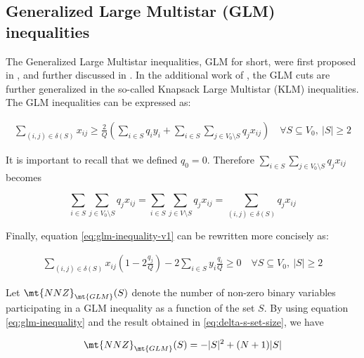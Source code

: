 \subsection{Generalized Large Multistar (GLM) inequalities}
The Generalized Large Multistar inequalities, GLM for short, were first proposed in \cite{gouveia_result_1995}, and further discussed in \cite{letchford2006projection}.
In the additional work of \cite{letchford_multistars_2002}, the GLM cuts are further generalized in the so-called Knapsack Large Multistar (KLM) inequalities.
The GLM inequalities can be expressed as:

\begin{equation}\label{eq:glm-inequality-v1}
	\begin{split}
		\sum_{(i, j) \in \delta(S)} x_{ij} \ge \frac{2}{Q} \left(  \sum_{i \in S} q_i y_i + \sum_{i \in S} \sum_{j \in V_0 \setminus S} q_j  x_{ij}\right) \quad \forall S \subseteq V_0,\ |S| \ge 2
	\end{split}
\end{equation}

It is important to recall that we defined $q_0 = 0$.
Therefore $\sum_{i \in S} \sum_{j \in V_0 \setminus S} q_j  x_{ij}$ becomes

\begin{equation}
	\sum_{i \in S} \sum_{j \in V_0 \setminus S} q_j  x_{ij} = \sum_{i \in S} \sum_{j \in V \setminus S} q_j  x_{ij} = \sum_{(i, j) \in \delta(S)} q_j x_{ij}
\end{equation}

Finally, equation \eqref{eq:glm-inequality-v1} can be rewritten more concisely as:

\begin{equation}\label{eq:glm-inequality}
	\begin{split}
		\sum_{(i, j) \in \delta(S)} x_{ij} \left( 1 - 2 \frac{q_j}{Q} \right)  -2 \sum_{i \in S} y_i \frac{q_i}{Q}  \ge  0   \quad \forall S \subseteq V_0,\ |S| \ge 2
	\end{split}
\end{equation}


Let $\mt{NNZ}_{\mt{GLM}}(S)$ denote the number of non-zero binary variables participating in a GLM inequality as a function of the set $S$.
By using equation \eqref{eq:glm-inequality} and the result obtained in \eqref{eq:delta-s-set-size}, we have

\begin{equation}
	\mt{NNZ}_{\mt{GLM}}(S) = -|S|^2 + (N + 1)|S|
\end{equation}

